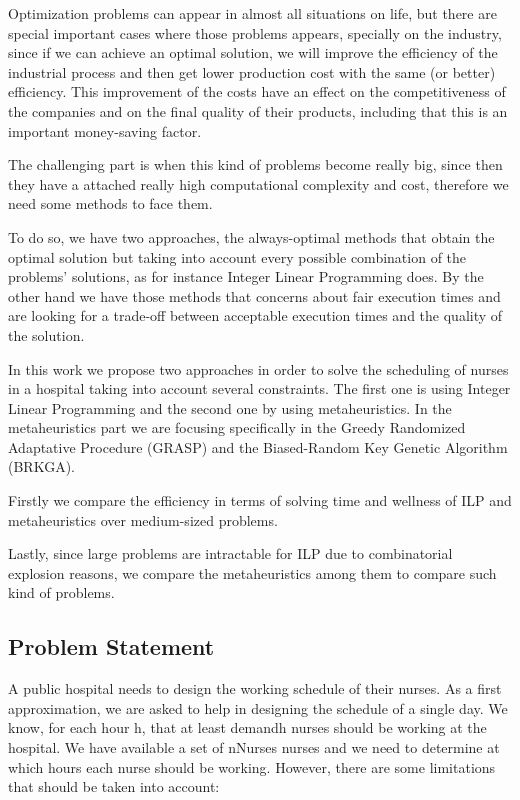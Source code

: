    Optimization problems can appear in almost all situations on life, but there are special important cases where those problems appears, specially on the industry, since if we can achieve an optimal solution, we will improve the efficiency of the industrial process and then get lower production cost with the same (or better) efficiency. This improvement of the costs have an effect on the competitiveness of the companies and on the final quality of their products, including that this is an important money-saving factor. 
   
   The challenging part is when this kind of problems become really big, since then they have a attached really high computational complexity and cost, therefore we need some methods to face them. 
   
   To do so, we have two approaches, the always-optimal methods that obtain the optimal solution but taking into account every possible combination of the problems' solutions, as for instance Integer Linear Programming does. By the other hand we have those methods that concerns about fair execution times and are looking for a trade-off between acceptable execution times and the quality of the solution.
   
   In this work we propose two approaches in order to solve the scheduling of nurses in a hospital taking into account several constraints. The first one is using Integer Linear Programming and the second one by using metaheuristics. In the metaheuristics part we are focusing specifically in the Greedy Randomized Adaptative Procedure (GRASP) and the Biased-Random Key Genetic Algorithm (BRKGA).
   
   Firstly we compare the efficiency in terms of solving time and wellness of ILP and metaheuristics over medium-sized problems. 
   
   Lastly, since large problems are intractable for ILP due to combinatorial explosion reasons, we compare the metaheuristics among them to compare such kind of problems.
   
   \subsection{Problem Statement}
   
   A public hospital needs to design the working schedule of their nurses. As a first approximation, we are asked to help in designing the schedule of a single day. We know, for each hour h, that at least demandh nurses should be working at the hospital. We have available a set of nNurses nurses and we need to determine at which hours each nurse should be working. However, there are some limitations that should be taken into account:
   
